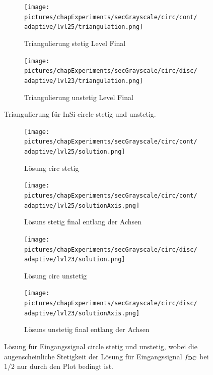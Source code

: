 \begin{figure}[p]
  \begin{subfigure}[b]{.48\linewidth}
    \centering
    \caption{Triangulierung stetig Level Final}
    \texttt{[image: pictures/chapExperiments/secGrayscale/circ/cont/adaptive/lvl25/triangulation.png]}
    \label{fig:circContFinalTriang}
  \end{subfigure}
  \quad
  \begin{subfigure}[b]{.48\linewidth}
    \centering
    \caption{Triangulierung unstetig Level Final}
    \texttt{[image: pictures/chapExperiments/secGrayscale/circ/disc/adaptive/lvl23/triangulation.png]}
    \label{fig:circDiscFinalTriang}
  \end{subfigure}
  \caption{Triangulierung für InSi circle stetig und unstetig.}
  \label{fig:circleTriang}
\end{figure}
\begin{figure}[p]
  \centering
  \begin{subfigure}[b]{.48\linewidth}
    \centering
    \caption{Lösung circ stetig}
    \texttt{[image: pictures/chapExperiments/secGrayscale/circ/cont/adaptive/lvl25/solution.png]}
    \label{fig:circContSol}
  \end{subfigure}
  \quad
  \begin{subfigure}[b]{.48\linewidth}
    \centering
    \caption{Lösuns stetig final entlang der Achsen}
    \texttt{[image: pictures/chapExperiments/secGrayscale/circ/cont/adaptive/lvl25/solutionAxis.png]}
    \label{fig:circContSolAxis}
  \end{subfigure}

  \begin{subfigure}[b]{.48\linewidth}
    \centering
    \caption{Lösung circ unstetig}
    \texttt{[image: pictures/chapExperiments/secGrayscale/circ/disc/adaptive/lvl23/solution.png]}
    \label{fig:circDiscSol}
  \end{subfigure}
  \quad
  \begin{subfigure}[b]{.48\linewidth}
    \centering
    \caption{Lösuns unstetig final entlang der Achsen}
    \texttt{[image: pictures/chapExperiments/secGrayscale/circ/disc/adaptive/lvl23/solutionAxis.png]}
    \label{fig:circDiscSolAxis}
  \end{subfigure}
  \caption{Lösung für Eingangssignal circle stetig und unstetig, wobei die
  augenscheinliche Stetigkeit der Lösung für Eingangssignal $f_\textup{DC}$
  bei $1/2$ nur durch den Plot bedingt ist.}
  \label{fig:circleSol}
\end{figure}
